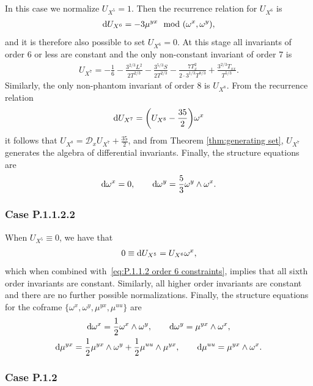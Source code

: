 \documentclass[pdftex]{sigma}%
\numberwithin{equation}{section}
\newcommand{\D}{\mathcal{D}}
\begin{document}
In this case we normalize $U_{X^5}=1$. Then the recurrence relation for $U_{X^6}$ is
\begin{gather*}
{\rm d}U_{X^6}=-3\mu^{yx} \mod(\omega^x,\omega^y),
\end{gather*}
and it is therefore also possible to set $U_{X^6}=0$. At this stage all invariants of order 6 or less are constant and the only non-constant invariant of order 7 is
\begin{gather*}
U_{X^7} = -\frac{1}{6}-\frac{3^{2/3}L^2}{2T^{2/3}} - \frac{3^{5/3}S}{2T^{2/3}}-\frac{7T_x^2}{2\cdot 3^{1/3}T^{8/3}}+\frac{3^{2/3}T_{xx}}{T^{5/3}}.
\end{gather*}
Similarly, the only non-phantom invariant of order 8 is $U_{X^8}$. From the recurrence relation
\begin{gather*}
{\rm d}U_{X^7} = \bigg(U_{X^8}-\frac{35}{2}\bigg)\omega^x
\end{gather*}
it follows that $U_{X^8} = \D_xU_{X^7}+\frac{35}{2}$, and from Theorem \ref{thm:generating set}, $U_{X^7}$ generates the algebra of differential invariants. Finally, the structure equations are
\begin{gather*}
{\rm d}\omega^x = 0,\qquad {\rm d}\omega^y=\frac{5}{3}\omega^y\wedge\omega^x.
\end{gather*}

\subsubsection{Case P.1.1.2.2}

When $U_{X^5} \equiv 0$, we have that
\begin{gather*}
0 \equiv {\rm d}U_{X^5} = U_{X^6}\omega^x,
\end{gather*}
which when combined with~\eqref{eq:P.1.1.2 order 6 constraints}, implies that all sixth order invariants are constant. Similarly, all higher order invariants are constant and there are no further possible normalizations. Finally, the structure equations for the coframe $\{\omega^x,\omega^y,\mu^{yx},\mu^{uu}\}$ are
\begin{gather*}
{\rm d}\omega^x=\frac{1}{2}\omega^x\wedge \omega^y,\qquad
{\rm d}\omega^y = \mu^{yx}\wedge \omega^x,
\\
{\rm d}\mu^{yx} = \frac{1}{2}\mu^{yx}\wedge \omega^y + \frac{1}{2}\mu^{uu}\wedge \mu^{yx},\qquad
{\rm d}\mu^{uu} = \mu^{yx}\wedge \omega^x.
\end{gather*}

\subsubsection{Case P.1.2}
\end{document}
